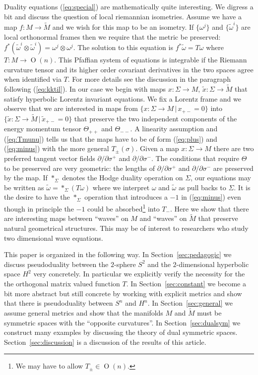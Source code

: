 \documentclass[a4paper,12pt]{article}
\DeclareMathOperator{\Orth}{O}
\newcommand{\hodge}{*_{\Sigma}}
\newcommand{\Mtil}{\widetilde{M}}
\newcommand{\omegatil}{\tilde{\omega}}
\newcommand{\xtil}{\tilde{x}}
\begin{document}
Duality equations (\ref{eq:special}) are mathematically quite
interesting.  We digress a bit and discuss the question of local
riemannian isometries.  Assume we have a map $f:M\to\Mtil$ and we wish
for this map to be an isometry.  If $\{\omega^{j}\}$ and
$\{\omegatil^{i}\}$ are local orthonormal frames then we require that
the metric be preserved: $f^{*}(\omegatil^{i}\otimes\omegatil^{i}) =
\omega^{j}\otimes\omega^{j}$.  The solution to this equation is
$f^{*}\omegatil = T\omega$ where $T:M \to \Orth(n)$.  This Pfaffian
system of equations is integrable \cite{BCG3} if the Riemann curvature
tensor and its higher order covariant derivatives in the two spaces
agree when identified via $T$.  For more details see the discussion in
the paragraph following (\ref{eq:kktil}).  In our case we begin with
maps $x:\Sigma \to M$, $\xtil:\Sigma \to \Mtil$ that satisfy
hyperbolic Lorentz invariant equations.  We fix a Lorentz frame and we
observe that we are interested in maps from $\{x:\Sigma\to M\,|\,
x_{+-}=0\}$ into $\{\xtil:\Sigma\to\Mtil\,|\, \xtil_{+-}=0\}$ that
preserve the two independent components of the energy momentum tensor
$\Theta_{++}$ and $\Theta_{--}$.  A linearity assumption and
(\ref{eq:Tmunu}) tells us that the maps have to be of form
(\ref{eq:plus}) and (\ref{eq:minus}) with the more general
$T_{\pm}(\sigma)$.  Given a map $x:\Sigma\to M$ there are two
preferred tangent vector fields $\partial/\partial\sigma^{+}$ and
$\partial/\partial\sigma^{-}$.  The conditions that require $\Theta$
to be preserved are very geometric: the lengths of
$\partial/\partial\sigma^{+}$ and $\partial/\partial\sigma^{-}$ are
preserved by the map.  If $\hodge$ denotes the Hodge duality operation
on $\Sigma$, our equations may be written as $\omegatil = \hodge
(T\omega)$ where we interpret $\omega$ and $\omegatil$ as pull backs
to $\Sigma$.  It is the desire to have the $\hodge$ operation that
introduces a $-1$ in (\ref{eq:minus}) even though in principle the
$-1$ could be absorbed\footnote{We may have to allow $T_{\pm} \in
\Orth(n)$.} into $T_{-}$.  Here we show that there are interesting
maps between ``waves'' on $M$ and ``waves'' on $\Mtil$ that preserve
natural geometrical structures.  This may be of interest to
researchers who study two dimensional wave equations.


This paper is organized in the following way.  In
Section~\ref{sec:pedagogic} we discuss pseudoduality between the
$2$-sphere $S^{2}$ and the $2$-dimensional hyperbolic space $H^{2}$ very
concretely.  In particular we explicitly verify the necessity for the
the orthogonal matrix valued function $T$.  In
Section~\ref{sec:constant} we become a bit more abstract but still
concrete by working with explicit metrics and show that there is
pseudoduality  between $S^{n}$ and $H^{n}$.  In
Section~\ref{sec:general} we assume general metrics and show that the
manifolds $M$ and $\Mtil$ must be symmetric spaces with the ``opposite
curvatures''.  In Section~\ref{sec:dualsym} we construct many examples
by discussing the theory of dual symmetric spaces. 
Section~\ref{sec:discussion} is a discussion of the results of this
article.
\end{document}
